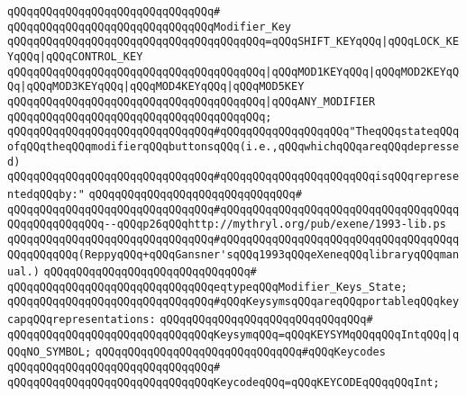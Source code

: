 \verb|qQQqqQQqqQQqqQQqqQQqqQQqqQQqqQQq#|\newline
\verb|qQQqqQQqqQQqqQQqqQQqqQQqqQQqqQQqModifier_Key|\newline
\verb|qQQqqQQqqQQqqQQqqQQqqQQqqQQqqQQqqQQqqQQq=qQQqSHIFT_KEYqQQq|\verb#|qQQqLOCK_KEYqQQq|qQQqCONTROL_KEY#\newline
\verb|qQQqqQQqqQQqqQQqqQQqqQQqqQQqqQQqqQQqqQQq|\verb#|qQQqMOD1KEYqQQq|qQQqMOD2KEYqQQq|qQQqMOD3KEYqQQq|qQQqMOD4KEYqQQq|qQQqMOD5KEY#\newline
\verb|qQQqqQQqqQQqqQQqqQQqqQQqqQQqqQQqqQQqqQQq|\verb#|qQQqANY_MODIFIER#\newline
\verb|qQQqqQQqqQQqqQQqqQQqqQQqqQQqqQQqqQQqqQQq;|\newline
\newline
\verb|qQQqqQQqqQQqqQQqqQQqqQQqqQQqqQQq#qQQqqQQqqQQqqQQqqQQq"TheqQQqstateqQQqofqQQqtheqQQqmodifierqQQqbuttonsqQQq(i.e.,qQQqwhichqQQqareqQQqdepressed)|\newline
\verb|qQQqqQQqqQQqqQQqqQQqqQQqqQQqqQQq#qQQqqQQqqQQqqQQqqQQqqQQqisqQQqrepresentedqQQqby:"|\newline
\verb|qQQqqQQqqQQqqQQqqQQqqQQqqQQqqQQq#|\newline
\verb|qQQqqQQqqQQqqQQqqQQqqQQqqQQqqQQq#qQQqqQQqqQQqqQQqqQQqqQQqqQQqqQQqqQQqqQQqqQQqqQQqqQQq--qQQqp26qQQqhttp://mythryl.org/pub/exene/1993-lib.ps|\newline
\verb|qQQqqQQqqQQqqQQqqQQqqQQqqQQqqQQq#qQQqqQQqqQQqqQQqqQQqqQQqqQQqqQQqqQQqqQQqqQQqqQQq(ReppyqQQq+qQQqGansner'sqQQq1993qQQqeXeneqQQqlibraryqQQqmanual.)|\newline
\verb|qQQqqQQqqQQqqQQqqQQqqQQqqQQqqQQq#|\newline
\verb|qQQqqQQqqQQqqQQqqQQqqQQqqQQqqQQqeqtypeqQQqModifier_Keys_State;|\newline
\newline
\verb|qQQqqQQqqQQqqQQqqQQqqQQqqQQqqQQq#qQQqKeysymsqQQqareqQQqportableqQQqkeycapqQQqrepresentations:|\newline
\verb|qQQqqQQqqQQqqQQqqQQqqQQqqQQqqQQq#|\newline
\verb|qQQqqQQqqQQqqQQqqQQqqQQqqQQqqQQqKeysymqQQq=qQQqKEYSYMqQQqqQQqIntqQQq|\verb#|qQQqNO_SYMBOL;#\newline
\newline
\verb|qQQqqQQqqQQqqQQqqQQqqQQqqQQqqQQq#qQQqKeycodes|\newline
\verb|qQQqqQQqqQQqqQQqqQQqqQQqqQQqqQQq#|\newline
\verb|qQQqqQQqqQQqqQQqqQQqqQQqqQQqqQQqKeycodeqQQq=qQQqKEYCODEqQQqqQQqInt;|\newline
